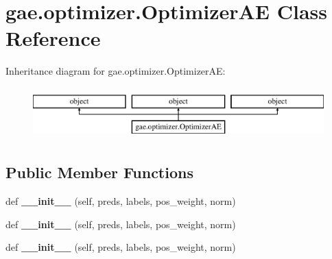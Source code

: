 \hypertarget{classgae_1_1optimizer_1_1OptimizerAE}{}\section{gae.\+optimizer.\+Optimizer\+AE Class Reference}
\label{classgae_1_1optimizer_1_1OptimizerAE}
Inheritance diagram for gae.\+optimizer.\+Optimizer\+AE\+:\begin{figure}[H]
\begin{center}
\leavevmode
\includegraphics[height=2.000000cm]{classgae_1_1optimizer_1_1OptimizerAE}
\end{center}
\end{figure}
\subsection*{Public Member Functions}
\begin{DoxyCompactItemize}
\item 
\mbox{\label{classgae_1_1optimizer_1_1OptimizerAE_ae8529b7a91b37fbe2c120a2427bc6333}} 
def {\bfseries \+\_\+\+\_\+init\+\_\+\+\_\+} (self, preds, labels, pos\+\_\+weight, norm)
\item 
\mbox{\label{classgae_1_1optimizer_1_1OptimizerAE_ae8529b7a91b37fbe2c120a2427bc6333}} 
def {\bfseries \+\_\+\+\_\+init\+\_\+\+\_\+} (self, preds, labels, pos\+\_\+weight, norm)
\item 
\mbox{\label{classgae_1_1optimizer_1_1OptimizerAE_ae8529b7a91b37fbe2c120a2427bc6333}} 
def {\bfseries \+\_\+\+\_\+init\+\_\+\+\_\+} (self, preds, labels, pos\+\_\+weight, norm)
\end{DoxyCompactItemize}
